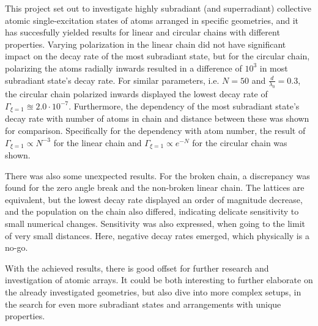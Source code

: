 \documentclass{article}
\begin{document}
\noindent
This project set out to investigate highly subradiant (and superradiant) collective atomic single-excitation states of atoms arranged in specific geometries, and it has succesfully yielded results for linear and circular chains with different properties. Varying polarization in the linear chain did not have significant impact on the decay rate of the most subradiant state, but for the circular chain, polarizing the atoms radially inwards resulted in a difference of $10^3$ in most subradiant state's decay rate. For similar parameters, i.e. $N=50$ and $\frac{d}{\lambda_0}=0.3$, the circular chain polarized inwards displayed the lowest decay rate of $\Gamma_{\xi=1} \approxeq 2.0 \cdot 10^{-7}$. Furthermore, the dependency of the most subradiant state's decay rate with number of atoms in chain and distance between these was shown for comparison. Specifically for the dependency with atom number, the result of $\Gamma_{\xi=1}\propto N^{-3}$ for the linear chain and $\Gamma_{\xi=1} \propto e^{-N}$ for the circular chain was shown. 

There was also some unexpected results. For the broken chain, a discrepancy was found for the zero angle break and the non-broken linear chain. The lattices are equivalent, but the lowest decay rate displayed an order of magnitude decrease, and the population on the chain also differed, indicating delicate sensitivity to small numerical changes. Sensitivity was also expressed, when going to the limit of very small distances. Here, negative decay rates emerged, which physically is a no-go. 

With the achieved results, there is good offset for further research and investigation of atomic arrays. It could be both interesting to further elaborate on the already investigated geometries, but also dive into more complex setups, in the search for even more subradiant states and arrangements with unique properties. 

\newpage
\printbibliography
\end{document}
